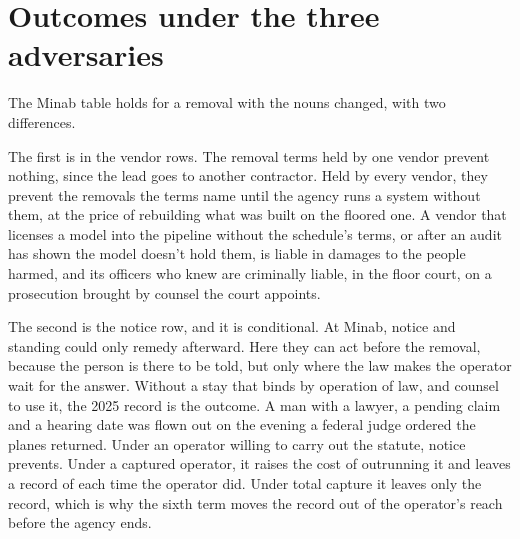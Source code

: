 \section{Outcomes under the three adversaries}
\label{sec:11.7}
The Minab table holds for a removal with the nouns changed, with two differences.

The first is in the vendor rows. The removal terms held by one vendor prevent nothing, since the lead goes to another contractor. Held by every vendor, they prevent the removals the terms name until the agency runs a system without them, at the price of rebuilding what was built on the floored one. A vendor that licenses a model into the pipeline without the schedule's terms, or after an audit has shown the model doesn't hold them, is liable in damages to the people harmed, and its officers who knew are criminally liable, in the floor court, on a prosecution brought by counsel the court appoints.

The second is the notice row, and it is conditional. At Minab, notice and standing could only remedy afterward. Here they can act before the removal, because the person is there to be told, but only where the law makes the operator wait for the answer. Without a stay that binds by operation of law, and counsel to use it, the 2025 record is the outcome. A man with a lawyer, a pending claim and a hearing date was flown out on the evening a federal judge ordered the planes returned. Under an operator willing to carry out the statute, notice prevents. Under a captured operator, it raises the cost of outrunning it and leaves a record of each time the operator did. Under total capture it leaves only the record, which is why the sixth term moves the record out of the operator's reach before the agency ends.
